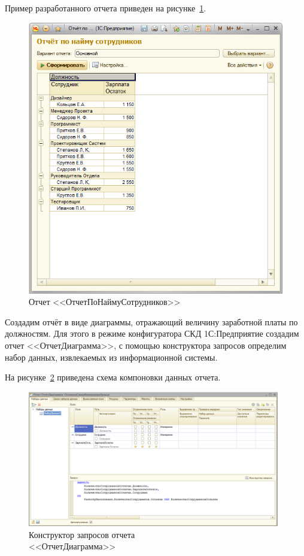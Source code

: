 \pagebreak

Пример разработанного отчета приведен на рисунке~\ref{fig:report_results}.
\begin{figure}[h!]
  \centering
  \includegraphics[width=130mm]{pic/report_results}
  \caption{Отчет <<ОтчетПоНаймуСотрудников>>}
  \label{fig:report_results}
\end{figure}

Создадим отчёт в виде диаграммы, отражающий величину заработной платы
по должностям. Для этого в режиме конфигуратора СКД 1С:Предприятие
создадим отчет <<ОтчетДиаграмма>>, с помощью конструктора запросов
определим набор данных, извлекаемых из информационной системы.

\pagebreak

На рисунке~\ref{fig:diagram_scheme} приведена схема компоновки данных отчета.
\begin{figure}[h!]
  \centering
  \includegraphics[width=110mm]{pic/diagram_scheme}
  \caption{Конструктор запросов отчета \\ <<ОтчетДиаграмма>>}
  \label{fig:diagram_scheme}
\end{figure}

